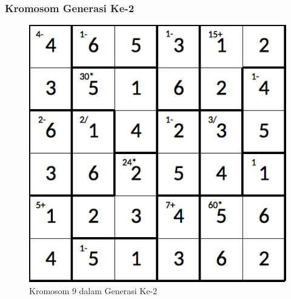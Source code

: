 \documentclass{beamer}
\begin{document}
\note{

}

\begin{frame}
\frametitle{Kromosom Generasi Ke-2}
\begin{figure}
\centering
\captionsetup{justification=centering}
\includegraphics[scale=0.333]{Gambar/hybridgenetic/Generation2Chromosome9}
\caption[Kromosom 9 dalam Generasi Ke-2]{Kromosom 9 dalam Generasi Ke-2}
\label{fig:analisisg2k9}
\end{figure}
\end{frame}

\note{

}
\end{document}
